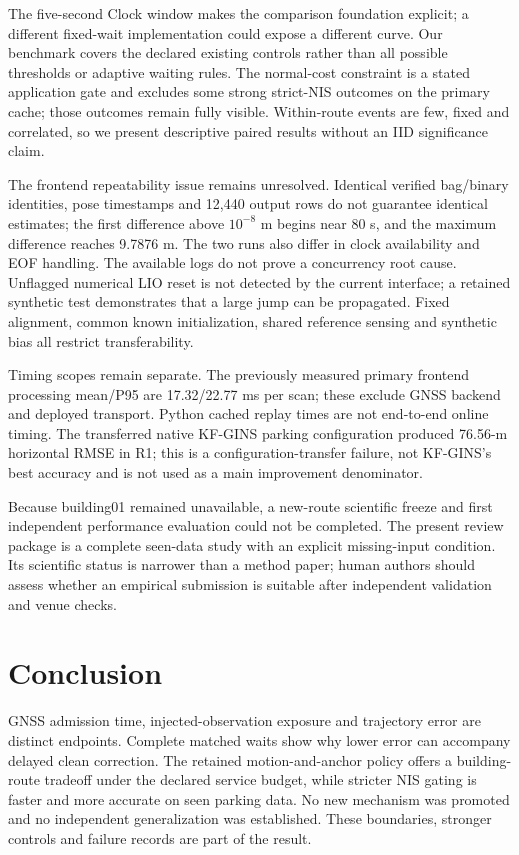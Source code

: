 \documentclass[conference]{IEEEtran}
\begin{document}
The five-second Clock window makes the comparison foundation explicit; a different fixed-wait implementation could expose a different curve. Our benchmark covers the declared existing controls rather than all possible thresholds or adaptive waiting rules. The normal-cost constraint is a stated application gate and excludes some strong strict-NIS outcomes on the primary cache; those outcomes remain fully visible. Within-route events are few, fixed and correlated, so we present descriptive paired results without an IID significance claim.

The frontend repeatability issue remains unresolved. Identical verified bag/binary identities, pose timestamps and 12,440 output rows do not guarantee identical estimates; the first difference above $10^{-8}$ m begins near 80 s, and the maximum difference reaches 9.7876 m. The two runs also differ in clock availability and EOF handling. The available logs do not prove a concurrency root cause. Unflagged numerical LIO reset is not detected by the current interface; a retained synthetic test demonstrates that a large jump can be propagated. Fixed alignment, common known initialization, shared reference sensing and synthetic bias all restrict transferability.

Timing scopes remain separate. The previously measured primary frontend processing mean/P95 are 17.32/22.77 ms per scan; these exclude GNSS backend and deployed transport. Python cached replay times are not end-to-end online timing. The transferred native KF-GINS parking configuration produced 76.56-m horizontal RMSE in R1; this is a configuration-transfer failure, not KF-GINS's best accuracy and is not used as a main improvement denominator.

Because building01 remained unavailable, a new-route scientific freeze and first independent performance evaluation could not be completed. The present review package is a complete seen-data study with an explicit missing-input condition. Its scientific status is narrower than a method paper; human authors should assess whether an empirical submission is suitable after independent validation and venue checks.

\section{Conclusion}
GNSS admission time, injected-observation exposure and trajectory error are distinct endpoints. Complete matched waits show why lower error can accompany delayed clean correction. The retained motion-and-anchor policy offers a building-route tradeoff under the declared service budget, while stricter NIS gating is faster and more accurate on seen parking data. No new mechanism was promoted and no independent generalization was established. These boundaries, stronger controls and failure records are part of the result.
\end{document}
